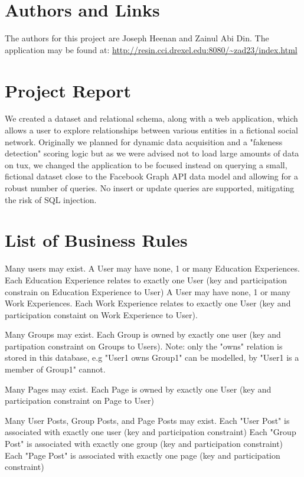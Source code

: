 \documentclass{article}
\begin{document}
\section{Authors and Links}

The authors for this project are Joseph Heenan and Zainul Abi Din. The application may be found at: \url{http://resin.cci.drexel.edu:8080/~zad23/index.html}

\section{Project Report}

We created a dataset and relational schema, along with a web application, which allows a user to explore relationships between various entities in a fictional social network. Originally we planned for dynamic data acquisition and a "fakeness detection" scoring logic but as we were advised not to load large amounts of data on tux, we changed the application to be focused instead on querying a small, fictional dataset close to the Facebook Graph API data model and allowing for a robust number of queries. No insert or update queries are supported, mitigating the risk of SQL injection.

\section{List of Business Rules}

Many users may exist.
A User may have none, 1 or many Education Experiences. Each Education Experience relates to exactly one User (key and participation constrain on Education Experience to User)
A User may have none, 1 or many Work Experiences. Each Work Experience relates to exactly one User (key and participation constaint on Work Experience to User).

Many Groups may exist. Each Group is owned by exactly one user (key and partipation constraint on Groups to Users). Note: only the "owns" relation is stored in this database, e.g "User1 owns Group1" can be modelled, by "User1 is a member of Group1" cannot.

Many Pages may exist. Each Page is owned by exactly one User (key and participation constraint on Page to User)

Many User Posts, Group Posts, and Page Posts may exist.
Each "User Post" is associated with exactly one user (key and participation constraint)
Each "Group Post" is associated with exactly one group (key and participation constraint)
Each "Page Post" is associated with exactly one page (key and participation constraint)
\end{document}
